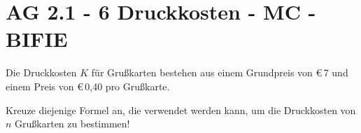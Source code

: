 \section{AG 2.1 - 6 Druckkosten - MC - BIFIE}

\begin{beispiel}[AG 2.1]{1} %
		Die Druckkosten $K$ für Grußkarten bestehen aus einem Grundpreis von \euro\,7 und einem Preis
von \euro\,0,40 pro Grußkarte. 

\leer

Kreuze diejenige Formel an, die verwendet werden kann, um die Druckkosten von $n$ Grußkarten zu bestimmen!

\end{beispiel}